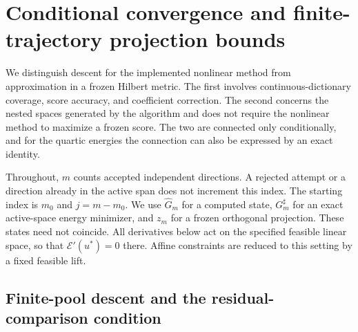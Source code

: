 \documentclass[11pt]{article}
\def\CGAChapterFiveStandalone{1}
\theoremstyle{remark}
\begin{document}
\setcounter{section}{4}
\fi
\providecommand{\cE}{\mathcal E}
\providecommand{\cD}{\mathcal D}
\providecommand{\cP}{\mathcal P}
\providecommand{\cK}{\mathcal K}
\providecommand{\cnorm}[1]{\left\lVert#1\right\rVert}
\providecommand{\cabs}[1]{\left|#1\right|}
\providecommand{\cinner}[2]{\left\langle#1,#2\right\rangle}
\providecommand{\cdd}{\,\mathrm d}
\providecommand{\cR}{\mathbb R}

\ifdefined\CGAChapterFiveStandalone
  \newcommand{\CGAHLDreference}{Section~3}
  \newcommand{\CGAEnergyMetricReference}{the energy--distance theorem and metric corollary in Section~4}
  \newcommand{\CGAEnergyTheoremReference}{the energy--distance theorem in Section~4}
\else
  \newcommand{\CGAHLDreference}{Section~\ref{sec:descent}}
  \newcommand{\CGAEnergyMetricReference}{Theorem~\ref{thm:energy-v} and Corollary~\ref{cor:metric-rates}}
  \newcommand{\CGAEnergyTheoremReference}{Theorem~\ref{thm:energy-v}}
\fi

\section{Conditional convergence and finite-trajectory projection bounds}
\label{sec:c5}

We distinguish descent for the implemented nonlinear method from approximation
in a frozen Hilbert metric. The first involves continuous-dictionary coverage,
score accuracy, and coefficient correction. The second concerns the nested
spaces generated by the algorithm and does not require the nonlinear method to
maximize a frozen score. The two are connected only conditionally, and for the
quartic energies the connection can also be expressed by an exact identity.

Throughout, $m$ counts accepted independent directions. A rejected attempt or
a direction already in the active span does not increment this index.
The starting index is $m_0$ and $j=m-m_0$. We use $\widehat G_m$ for a computed
state, $G_m^\sharp$ for an exact active-space energy minimizer, and $z_m$
for a frozen orthogonal projection. These states need not coincide.
All derivatives below act on the specified feasible linear space, so that
$\cE'(u^*)=0$ there. Affine constraints are reduced to this setting by a
fixed feasible lift.

\subsection{Finite-pool descent and the residual-comparison condition}
\label{sec:c5-descent}
\end{document}
